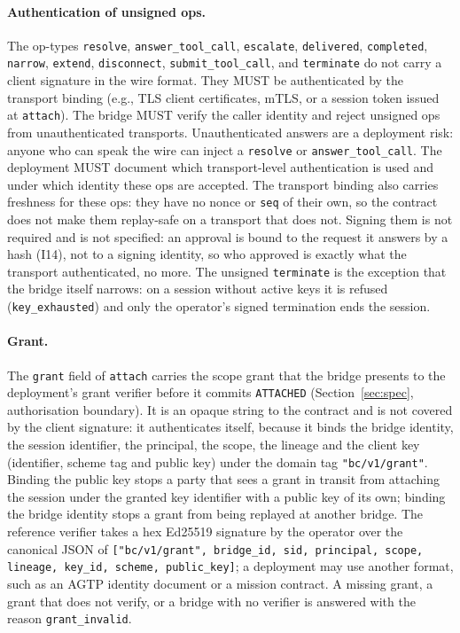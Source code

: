 \paragraph{Authentication of unsigned ops.}
The op-types \texttt{resolve}, \texttt{answer\_tool\_call},
\texttt{escalate}, \texttt{delivered}, \texttt{completed},
\texttt{narrow}, \texttt{extend}, \texttt{disconnect},
\texttt{submit\_tool\_call}, and \texttt{terminate} do not
carry a client signature in the wire format. They MUST be
authenticated by the transport binding (e.g., TLS client
certificates, mTLS, or a session token issued at \texttt{attach}).
The bridge MUST verify the caller identity and reject unsigned
ops from unauthenticated transports. Unauthenticated answers are a
deployment risk: anyone who can speak the wire can inject a
\texttt{resolve} or \texttt{answer\_tool\_call}. The deployment
MUST document which transport-level authentication is used and
under which identity these ops are accepted. The transport binding
also carries freshness for these ops: they have no nonce or
\texttt{seq} of their own, so the contract does not make them
replay-safe on a transport that does not. Signing them is not
required and is not specified: an approval is bound to the request it
answers by a hash (I14), not to a signing identity, so who approved is
exactly what the transport authenticated, no more. The unsigned
\texttt{terminate} is the exception that the bridge itself narrows: on a
session without active keys it is refused (\texttt{key\_exhausted}) and only
the operator's signed termination ends the session.

\paragraph{Grant.}
The \texttt{grant} field of \texttt{attach} carries the scope grant that
the bridge presents to the deployment's grant verifier before it commits
\texttt{ATTACHED} (Section~\ref{sec:spec}, authorisation boundary). It is
an opaque string to the contract and is not covered by the client
signature: it authenticates itself, because it binds the bridge identity,
the session identifier, the principal, the scope, the lineage and the
client key (identifier, scheme tag and public key) under the domain tag
\texttt{"bc/v1/grant"}. Binding the public key stops a party that sees
a grant in transit from attaching the session under the granted key
identifier with a public key of its own; binding the bridge identity
stops a grant from being replayed at another bridge. The reference
verifier takes a hex Ed25519 signature by the operator over the
canonical JSON of \texttt{["bc/v1/grant", bridge\_id, sid, principal,
scope, lineage, key\_id, scheme, public\_key]}; a
deployment may use another format, such as an AGTP identity document or
a mission contract. A missing grant, a grant that does not verify, or a
bridge with no verifier is answered with the reason
\texttt{grant\_invalid}.

